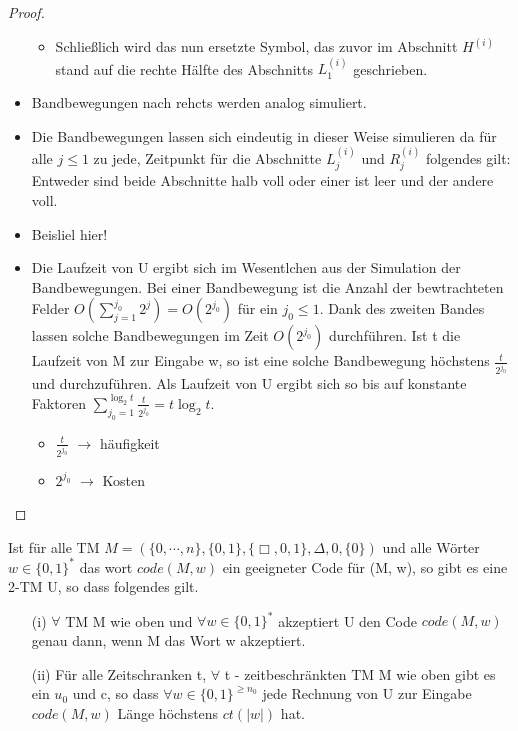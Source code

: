 \begin{proof}
\begin{itemize}
\begin{itemize}
                    \item Schließlich wird das nun ersetzte Symbol, das zuvor im Abschnitt \(H^{(i)}\) stand auf die rechte Hälfte des Abschnitts \(L_1^{(i)}\) geschrieben.
                \end{itemize}
                \item Bandbewegungen nach rehcts werden analog simuliert.
                \item Die Bandbewegungen lassen sich eindeutig in dieser Weise simulieren da für alle \( j \leq 1\) zu jede, Zeitpunkt für die Abschnitte \(L_j^{(i)}\) und \(R_j^{(i)}\) folgendes gilt: Entweder sind beide Abschnitte halb voll oder einer ist leer und der andere voll.
                \item Beisliel hier!
                \item Die Laufzeit von U ergibt sich im Wesentlchen aus der Simulation der Bandbewegungen. Bei einer Bandbewegung ist die Anzahl der bewtrachteten Felder \(O(\sum\limits_{j = 1}^{j_0} 2^j) = O(2^{j_0})\) für ein \(j_0 \leq 1\). Dank des zweiten Bandes lassen solche Bandbewegungen im Zeit \(O(2^{j_0})\) durchführen. Ist t die Laufzeit von M zur Eingabe w, so ist eine solche Bandbewegung höchstens \(\frac{t}{2^{j_0}}\) und durchzuführen. Als Laufzeit von U ergibt sich so bis auf konstante Faktoren \(\sum\limits_{j_0 = 1}^{\log_2 t} \frac{t}{2^{j_0}} = t\log_2 t\).
                \begin{itemize}
                    \item \(\frac{t}{2^{j_0}}\) \(\to\) häufigkeit
                    \item \(2^{j_0}\) \(\to \) Kosten
                \end{itemize}
            \end{itemize}
    \end{proof}
\newpage
{}
    Ist für alle TM \(M = (\{0, \cdots, n\}, \{0, 1\}, \{\Box, 0, 1\}, \Delta, 0, \{0\})\) und alle Wörter \(w \in \{0, 1\}^*\) das wort \(code(M, w)\) ein geeigneter Code für (M, w), so gibt es eine 2-TM U, so dass folgendes gilt.
    \begin{itemize}
        \item [(i)] \(\forall\) TM M wie oben und \(\forall w \in \{0, 1\}^*\) akzeptiert U den Code \(code(M, w)\) genau dann, wenn M das Wort w akzeptiert.
        \item [(ii)] Für alle Zeitschranken t, \(\forall\) t - zeitbeschränkten TM M wie oben gibt es ein \(u_0\) und c, so dass \(\forall w \in \{0, 1\}^{\geq n_0}\) jede Rechnung von U zur Eingabe \(code(M, w)\) Länge höchstens \(ct(|w|)\) hat.
    \end{itemize}
